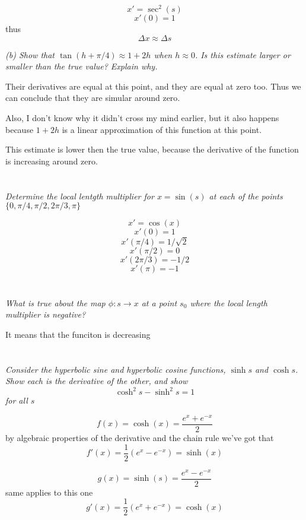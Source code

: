 \documentclass[11pt,oneside,titlepage]{book}
\begin{document}
$$x' = \sec^2(s)$$
$$x'(0) = 1$$
thus
$$\Delta x \approx \Delta s$$

\textit{(b) Show that $\tan(h + \pi/4) \approx 1 + 2h$ when $h \approx 0$. Is this estimate larger
  or smaller than the true value? Explain why.}

Their derivatives are equal at this point, and they are equal at zero too. Thus we can conclude
that they are simular around zero.

Also, I don't know why it didn't cross my mind earlier, but it also happens
because $1 + 2h$ is a linear approximation of this function at this point.

This estimate is lower then the true value, because the derivative of the function is increasing
around zero.

\section{}

\textit{Determine the local lentgth multiplier for $x = \sin(s)$ at each of the
  points $\{0, \pi/4, \pi/2, 2\pi/3, \pi\}$}

$$x' = \cos(x)$$
$$x'(0) = 1$$
$$x'(\pi/4) = 1/\sqrt{2}$$
$$x'(\pi/2) = 0$$
$$x'(2 \pi/3) = -1/2$$
$$x'(\pi) = -1$$

\section{}

\textit{What is true about the map $\phi: s \to x$ at a point $s_0$ where the local length
  multiplier is negative?}

It means that the funciton is decreasing

\section{}

\textit{Consider the hyperbolic sine and hyperbolic cosine functions, $\sinh s$ and
  $\cosh s$. Show each is the derivative of the other, and show }
$$\cosh^2 s - \sinh^2 s = 1$$
\textit{for all $s$}

$$f(x) = \cosh(x) = \frac{e^x + e^{-x}}{2}$$
by algebraic properties of the derivative and the chain rule we've got that
$$f'(x) = \frac{1}{2}(e^x - e^{-x}) = \sinh(x)$$

$$g(x) = \sinh(s) = \frac{e^x - e^{-x}}{2}$$
same applies to this one
$$g'(x) = \frac{1}{2}(e^x +  e^{-x}) = \cosh(x)$$
\end{document}
